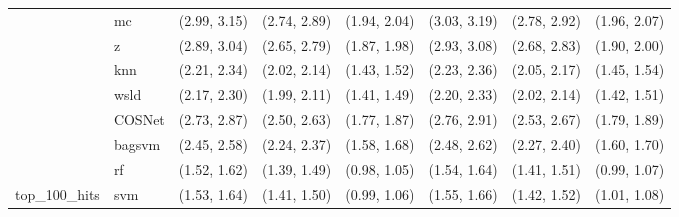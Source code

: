 \begin{table}[H]
{\begin{tabular}{llllllll}
 & mc & (2.99, 3.15) & (2.74, 2.89) & (1.94, 2.04) & (3.03, 3.19) & (2.78, 2.92) & (1.96, 2.07)\\

 & z & (2.89, 3.04) & (2.65, 2.79) & (1.87, 1.98) & (2.93, 3.08) & (2.68, 2.83) & (1.90, 2.00)\\

 & knn & (2.21, 2.34) & (2.02, 2.14) & (1.43, 1.52) & (2.23, 2.36) & (2.05, 2.17) & (1.45, 1.54)\\

 & wsld & (2.17, 2.30) & (1.99, 2.11) & (1.41, 1.49) & (2.20, 2.33) & (2.02, 2.14) & (1.42, 1.51)\\

 & COSNet & (2.73, 2.87) & (2.50, 2.63) & (1.77, 1.87) & (2.76, 2.91) & (2.53, 2.67) & (1.79, 1.89)\\

 & bagsvm & (2.45, 2.58) & (2.24, 2.37) & (1.58, 1.68) & (2.48, 2.62) & (2.27, 2.40) & (1.60, 1.70)\\

 & rf & (1.52, 1.62) & (1.39, 1.49) & (0.98, 1.05) & (1.54, 1.64) & (1.41, 1.51) & (0.99, 1.07)\\

\multirow{-15}{*}{\raggedright\arraybackslash top\_100\_hits} & svm & (1.53, 1.64) & (1.41, 1.50) & (0.99, 1.06) & (1.55, 1.66) & (1.42, 1.52) & (1.01, 1.08)\\
\bottomrule
\end{tabular}}
\end{table}
